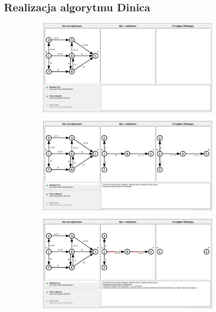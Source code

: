\begin{appendices}
 	\chapter{Realizacja algorytmu Dinica}\label{add:dinicExample}
 	\setlength\intextsep{10pt}
 	\begin{figure}[H]
 		\centering
 		\begin{subfigure}{\textwidth}
 			\includegraphics[width=0.9\linewidth]{./img/dinic01.jpg}
 		\end{subfigure}\par\bigskip
 		\begin{subfigure}{\textwidth}
 			\includegraphics[width=0.9\linewidth]{./img/dinic02.jpg}
 		\end{subfigure}
 	\end{figure}
 	\begin{figure}
 		\ContinuedFloat
 		\begin{subfigure}{\textwidth}
 			\includegraphics[width=0.9\linewidth]{./img/dinic03.jpg}

\end{subfigure}
\end{figure}
\end{appendices}
